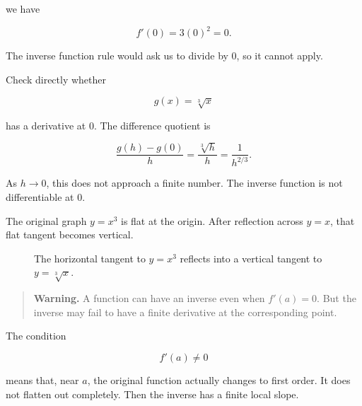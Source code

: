 we have

\[
f'(0)=3(0)^2=0.
\]

The inverse function rule would ask us to divide by \(0\), so it cannot apply.

Check directly whether

\[
g(x)=\sqrt[3]{x}
\]

has a derivative at \(0\).  The difference quotient is

\[
\frac{g(h)-g(0)}{h}
=
\frac{\sqrt[3]{h}}{h}
=
\frac1{h^{2/3}}.
\]

As \(h\to0\), this does not approach a finite number.  The inverse function is not differentiable at \(0\).

The original graph \(y=x^3\) is flat at the origin.  After reflection across \(y=x\), that flat tangent becomes vertical.

\begin{figure}[h]
\centering
{}
\caption{The horizontal tangent to \(y=x^3\) reflects into a vertical tangent to \(y=\sqrt[3]{x}\).}
\label{fig:x-cubed-inverse-vertical}
\end{figure}

\begin{quote}
\textbf{Warning.}
A function can have an inverse even when \(f'(a)=0\).  But the inverse may fail to have a finite derivative at the corresponding point.
\end{quote}

The condition

\[
f'(a)\neq0
\]

means that, near \(a\), the original function actually changes to first order.  It does not flatten out completely.  Then the inverse has a finite local slope.

